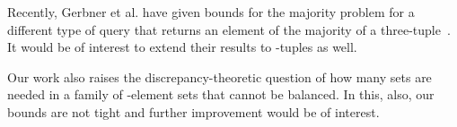 \documentclass[11pt]{llncs}
\begin{document}
Recently, Gerbner et al. have given bounds for the majority problem for a different type of query that returns an element of the majority of a three-tuple~\cite{GerKesPal-EC-15}. It would be of interest to extend their results to -tuples as well.

Our work also raises the discrepancy-theoretic question of how many sets are needed in a family of -element sets that cannot be balanced. In this, also, our bounds are not tight and further improvement would be of interest.

{
\ifFull
\raggedright

\else

\fi
}
\end{document}
